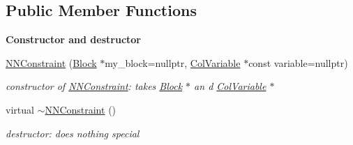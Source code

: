 \subsection*{Public Member Functions}
\begin{Indent}\textbf{ Constructor and destructor}\par
\begin{DoxyCompactItemize}
\item 
\mbox{\hyperlink{class_s_m_spp__di__unipi__it_1_1_n_n_constraint_a13f5a366f81cae0512e155e7ce9d32d0}{N\+N\+Constraint}} (\mbox{\hyperlink{class_s_m_spp__di__unipi__it_1_1_block}{Block}} $\ast$my\+\_\+block=nullptr, \mbox{\hyperlink{class_s_m_spp__di__unipi__it_1_1_col_variable}{Col\+Variable}} $\ast$const variable=nullptr)
\begin{DoxyCompactList}\small\item\em constructor of \mbox{\hyperlink{class_s_m_spp__di__unipi__it_1_1_n_n_constraint}{N\+N\+Constraint}}\+: takes \mbox{\hyperlink{class_s_m_spp__di__unipi__it_1_1_block}{Block}} $\ast$ an d \mbox{\hyperlink{class_s_m_spp__di__unipi__it_1_1_col_variable}{Col\+Variable}} $\ast$ \end{DoxyCompactList}\item 
\mbox{\label{class_s_m_spp__di__unipi__it_1_1_n_n_constraint_aa5546f00bfa476cf32ef4cbaca9ebbd4}} 
virtual \mbox{\hyperlink{class_s_m_spp__di__unipi__it_1_1_n_n_constraint_aa5546f00bfa476cf32ef4cbaca9ebbd4}{$\sim$\+N\+N\+Constraint}} ()
\begin{DoxyCompactList}\small\item\em destructor\+: does nothing special \end{DoxyCompactList}\end{DoxyCompactItemize}
\end{Indent}
